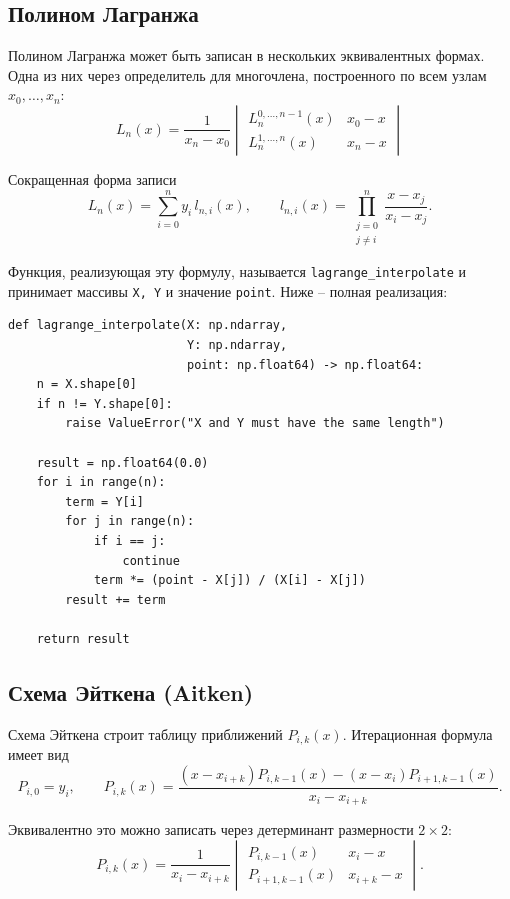 \subsection{Полином Лагранжа}
Полином Лагранжа может быть записан в нескольких эквивалентных формах. Одна из них через определитель для многочлена, построенного по всем узлам $x_0,\dots,x_n$:
\[
L_n(x)=\frac{1}{x_n-x_0}\begin{vmatrix}L_n^{0,\dots,n-1}(x) & x_0-x\\[4pt]
L_n^{1,\dots,n}(x) & x_n-x\end{vmatrix}
\]

Сокращенная форма записи
\[
L_n(x)=\sum_{i=0}^{n} y_i\,l_{n,i}(x),\qquad l_{n,i}(x)=\prod_{\substack{j=0\\ j\ne i}}^{n}\frac{x-x_j}{x_i-x_j}.
\]

Функция, реализующая эту формулу, называется \texttt{lagrange\_interpolate} и принимает массивы \texttt{X, Y} и значение \texttt{point}. Ниже -- полная реализация:
\begin{lstlisting}[style=pythonstyle,caption={Реализация Лагранжа}]
def lagrange_interpolate(X: np.ndarray,
                         Y: np.ndarray,
                         point: np.float64) -> np.float64:
    n = X.shape[0]
    if n != Y.shape[0]:
        raise ValueError("X and Y must have the same length")

    result = np.float64(0.0)
    for i in range(n):
        term = Y[i]
        for j in range(n):
            if i == j:
                continue
            term *= (point - X[j]) / (X[i] - X[j])
        result += term

    return result
\end{lstlisting}

\subsection{Схема Эйткена (Aitken)}
Схема Эйткена строит таблицу приближений $P_{i,k}(x)$. Итерационная формула имеет вид
\[
P_{i,0}=y_i,\qquad P_{i,k}(x)=\frac{(x-x_{i+k})P_{i,k-1}(x)-(x-x_i)P_{i+1,k-1}(x)}{x_i-x_{i+k}}.
\]

Эквивалентно это можно записать через детерминант размерности $2\times 2$:
\[
P_{i,k}(x)=\frac{1}{x_i-x_{i+k}}\begin{vmatrix}P_{i,k-1}(x) & x_i-x\\[4pt]
P_{i+1,k-1}(x) & x_{i+k}-x\end{vmatrix}.
\]

